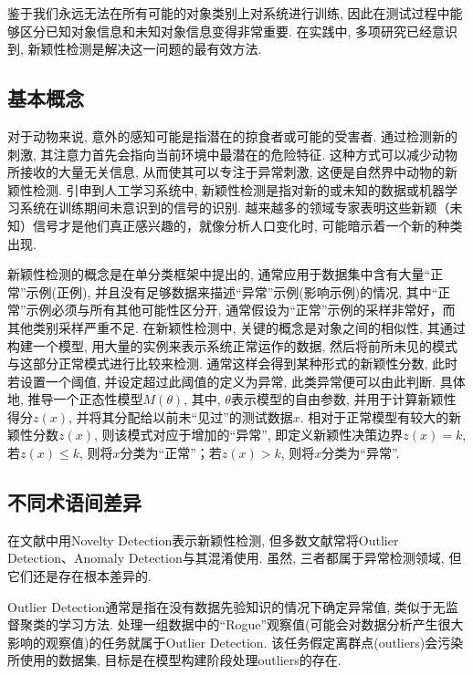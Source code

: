 \documentclass{Style/aas}
\begin{document}
鉴于我们永远无法在所有可能的对象类别上对系统进行训练, 因此在测试过程中能够区分已知对象信息和未知对象信息变得非常重要. 在实践中, 多项研究已经意识到, 新颖性检测是解决这一问题的最有效方法\cite{pimentel2014review}.\onecolumn\begin{multicols}{2}

  \section{基本概念}
  对于动物来说, 意外的感知可能是指潜在的掠食者或可能的受害者. 通过检测新的刺激, 其注意力首先会指向当前环境中最潜在的危险特征. 这种方式可以减少动物所接收的大量无关信息, 从而使其可以专注于异常刺激, 这便是自然界中动物的新颖性检测. 引申到人工学习系统中, 新颖性检测是指对新的或未知的数据或机器学习系统在训练期间未意识到的信号的识别\cite{markou2003novelty}. 越来越多的领域专家表明这些新颖（未知）信号才是他们真正感兴趣的，就像分析人口变化时, 可能暗示着一个新的种类出现\cite{bartkowiak2011anomaly}.

  新颖性检测的概念是在单分类框架中提出的\cite{pimentel2014review}, 通常应用于数据集中含有大量“正常”示例(正例), 并且没有足够数据来描述“异常”示例(影响示例)的情况, 其中“正常”示例必须与所有其他可能性区分开, 通常假设为“正常”示例的采样非常好，而其他类别采样严重不足. 在新颖性检测中, 关键的概念是对象之间的相似性\cite{bartkowiak2011anomaly}, 其通过构建一个模型, 用大量的实例来表示系统正常运作的数据, 然后将前所未见的模式与这部分正常模式进行比较来检测. 通常这样会得到某种形式的新颖性分数, 此时若设置一个阈值, 并设定超过此阈值的定义为异常, 此类异常便可以由此判断. 具体地, 推导一个正态性模型$ M\left( \theta \right) $, 其中, $\theta $表示模型的自由参数, 并用于计算新颖性得分$z\left( x \right) $, 并将其分配给以前未“见过”的测试数据$x$. 相对于正常模型有较大的新颖性分数$z\left( x \right) $, 则该模式对应于增加的“异常”, 即定义新颖性决策边界$z\left( x \right) =k$, 若$ z\left( x \right) \le k $, 则将$x$分类为“正常”；若$ z\left( x \right) >k $, 则将$x$分类为“异常”.

  \subsection{不同术语间差异}
  在文献中用Novelty Detection表示新颖性检测, 但多数文献常将Outlier Detection、Anomaly Detection与其混淆使用. 虽然, 三者都属于异常检测领域, 但它们还是存在根本差异的.

  Outlier Detection通常是指在没有数据先验知识的情况下确定异常值, 类似于无监督聚类的学习方法. 处理一组数据中的“Rogue”观察值(可能会对数据分析产生很大影响的观察值)的任务就属于Outlier Detection. 该任务假定离群点(outliers)会污染所使用的数据集, 目标是在模型构建阶段处理outliers的存在.


\end{multicols}
\end{document}
